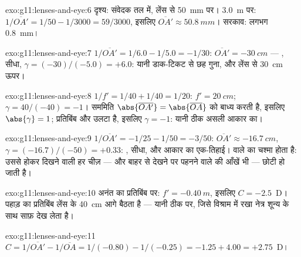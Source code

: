 \begin{solution}{exo:g11:lenses-and-eye:6}
दृश्य: संवेदक  तल में, लेंस से \qty{50}{mm} पर। \qty{3.0}{m} पर:
$1/\overline{OA'} = 1/50 - 1/3000 = 59/3000$, इसलिए $\overline{OA'} \approx \qty{50.8}{mm}$। सरकाव: लगभग \qty{0.8}{mm}।
\end{solution}

\begin{solution}{exo:g11:lenses-and-eye:7}
$1/\overline{OA'} = 1/6.0 - 1/5.0 = -1/30$: $\overline{OA'} = \qty{-30}{cm}$ --- , सीधा, $\gamma = (-30)/(-5.0) = +6.0$: यानी डाक-टिकट से छह
गुना, और लेंस से \qty{30}{cm} ऊपर।
\end{solution}

\begin{solution}{exo:g11:lenses-and-eye:8}
$1/f' = 1/40 + 1/40 = 1/20$: $f' = \qty{20}{cm}$; $\gamma = 40/(-40) = -1$। सममिति $\abs{\overline{OA'}} = \abs{\overline{OA}}$ को बाध्य करती है, इसलिए
$\abs{\gamma} = 1$; प्रतिबिंब  और उलटा है, इसलिए $\gamma = -1$: यानी ठीक
असली आकार का।
\end{solution}

\begin{solution}{exo:g11:lenses-and-eye:9}
$1/\overline{OA'} = -1/25 - 1/50 = -3/50$: $\overline{OA'} \approx \qty{-16.7}{cm}$, $\gamma = (-16.7)/(-50) = +0.33$: , सीधा, और आकार का एक-तिहाई।
 वाले का चश्मा  होता है: उससे होकर दिखने
वाली हर चीज़ --- और बाहर से देखने पर पहनने वाले की आँखें भी --- छोटी हो
जाती है।
\end{solution}

\begin{solution}{exo:g11:lenses-and-eye:10}
अनंत का प्रतिबिंब  पर: $f' = \qty{-0.40}{m}$, इसलिए $C = -2.5$~D। पहाड़ का
प्रतिबिंब लेंस के \qty{40}{cm} आगे बैठता है --- यानी ठीक
 पर, जिसे विश्राम में रखा नेत्र शून्य  के
साथ साफ़ देख लेता है।
\end{solution}

\begin{solution}{exo:g11:lenses-and-eye:11}
$C = 1/\overline{OA'} - 1/\overline{OA} = 1/(-0.80) - 1/(-0.25)
= -1.25 + 4.00 = +2.75$~D।
\end{solution}

